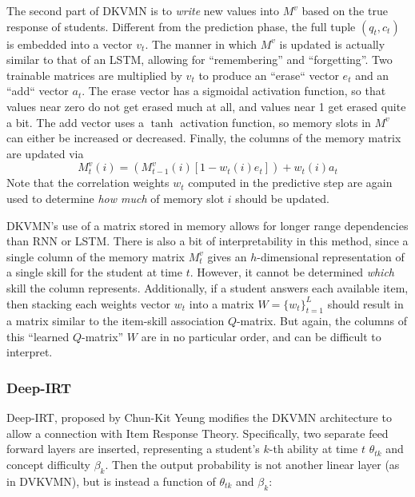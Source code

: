 The second part of DKVMN is to \textit{write} new values into $M^v$ based on the true response of students. Different from the prediction phase, the full tuple $(q_t,c_t)$ is embedded into a vector $v_t$. The manner in which $M^v$ is updated is actually similar to that of an LSTM, allowing for ``remembering'' and ``forgetting''. Two trainable matrices are multiplied by $v_t$ to produce an ``erase`` vector $e_t$ and an ``add`` vector $a_t$. The erase vector has a sigmoidal activation function, so that values near zero do not get erased much at all, and values near 1 get erased quite a bit. The add vector uses a $\tanh$ activation function, so memory slots in $M^v$ can either be increased or decreased. Finally, the columns of the memory matrix are updated via
\begin{equation}
  M_{t}^v(i) = (M_{t-1}^v(i) [1 - w_t(i) e_t] ) + w_t(i) a_t
  \label{eq:update_dkvmn}
\end{equation}
Note that the correlation weights $w_t$ computed in the predictive step are again used to determine \textit{how much} of memory slot $i$ should be updated.


DKVMN's use of a matrix stored in memory allows for longer range dependencies than RNN or LSTM. There is also a bit of interpretability in this method, since a single column of the memory matrix $M_t^v$ gives an $h$-dimensional representation of a single skill for the student at time $t$. However, it cannot be determined \textit{which} skill the column represents. Additionally, if a student answers each available item, then stacking each weights vector $w_t$ into a matrix $W = \{w_t\}_{t=1}^L$ should result in a matrix similar to the item-skill association $Q$-matrix. But again, the columns of this ``learned $Q$-matrix'' $W$ are in no particular order, and can be difficult to interpret.

\subsubsection{Deep-IRT}
Deep-IRT, proposed by Chun-Kit Yeung \cite{yeung_2019} modifies the DKVMN architecture to allow a connection with Item Response Theory. Specifically, two separate feed forward layers are inserted, representing a student's $k$-th ability at time $t$ $\theta_{tk}$ and concept difficulty $\beta_k$. Then the output probability is not another linear layer (as in DVKVMN), but is instead a function of $\theta_{tk}$ and $\beta_k$:

